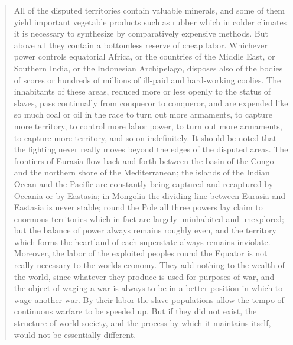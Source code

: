 \begin{quotation}
All of the disputed territories contain valuable minerals, and some of
them yield important vegetable products such as rubber which in colder
climates it is necessary to synthesize by comparatively expensive
methods. But above all they contain a bottomless reserve of cheap labor.
Whichever power controls equatorial Africa, or the countries of the
Middle East, or Southern India, or the Indonesian Archipelago, disposes
also of the bodies of scores or hundreds of millions of ill-paid and
hard-working coolies. The inhabitants of these areas, reduced more or
less openly to the status of slaves, pass continually from conqueror to
conqueror, and are expended like so much coal or oil in the race to turn
out more armaments, to capture more territory, to control more labor
power, to turn out more armaments, to capture more territory, and so on
indefinitely. It should be noted that the fighting never really moves
beyond the edges of the disputed areas. The frontiers of Eurasia flow
back and forth between the basin of the Congo and the northern shore of
the Mediterranean; the islands of the Indian Ocean and the Pacific are
constantly being captured and recaptured by Oceania or by Eastasia; in
Mongolia the dividing line between Eurasia and Eastasia is never stable;
round the Pole all three powers lay claim to enormous territories which
in fact are largely uninhabited and unexplored; but the balance of power
always remains roughly even, and the territory which forms the heartland
of each superstate always remains inviolate. Moreover, the labor of the
exploited peoples round the Equator is not really necessary to the
world\textquotesingle s economy. They add nothing to the wealth of the
world, since whatever they produce is used for purposes of war, and the
object of waging a war is always to be in a better position in which to
wage another war. By their labor the slave populations allow the tempo
of continuous warfare to be speeded up. But if they did not exist, the
structure of world society, and the process by which it maintains
itself, would not be essentially different.
\end{quotation}

